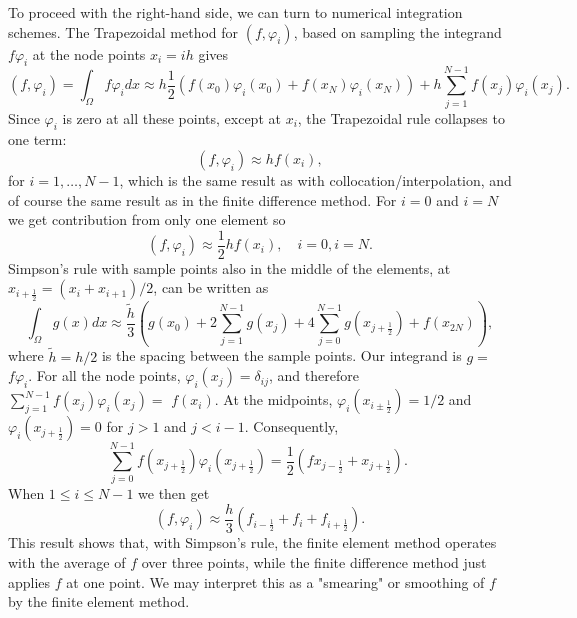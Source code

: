 \documentclass[../main.tex]{subfiles}
\begin{document}
To proceed with the right-hand side, we can turn to numerical integration schemes. The Trapezoidal method for $\left(f, \varphi_{i}\right)$, based on sampling the integrand $f \varphi_{i}$ at the node points $x_{i}=i h$ gives
$$
\left(f, \varphi_{i}\right)=\int_{\Omega} f \varphi_{i} d x \approx h \frac{1}{2}\left(f\left(x_{0}\right) \varphi_{i}\left(x_{0}\right)+f\left(x_{N}\right) \varphi_{i}\left(x_{N}\right)\right)+h \sum_{j=1}^{N-1} f\left(x_{j}\right) \varphi_{i}\left(x_{j}\right) .
$$
Since $\varphi_{i}$ is zero at all these points, except at $x_{i}$, the Trapezoidal rule collapses to one term:
\begin{equation}\label{eqa86}
	\left(f, \varphi_{i}\right) \approx h f\left(x_{i}\right),
\end{equation}
for $i=1, \ldots, N-1$, which is the same result as with collocation/interpolation, and of course the same result as in the finite difference method. For $i=0$ and $i=N$ we get contribution from only one element so
\begin{equation}\label{eqa87}
	\left(f, \varphi_{i}\right) \approx \frac{1}{2} h f\left(x_{i}\right), \quad i=0, i=N .
\end{equation}
Simpson's rule with sample points also in the middle of the elements, at $x_{i+\frac{1}{2}}=\left(x_{i}+x_{i+1}\right) / 2$, can be written as
$$
\int_{\Omega} g(x) d x \approx \frac{\tilde{h}}{3}\left(g\left(x_{0}\right)+2 \sum_{j=1}^{N-1} g\left(x_{j}\right)+4 \sum_{j=0}^{N-1} g\left(x_{j+\frac{1}{2}}\right)+f\left(x_{2 N}\right)\right),
$$
where $\tilde{h}=h / 2$ is the spacing between the sample points. Our integrand is $g=$ $f \varphi_{i}$. For all the node points, $\varphi_{i}\left(x_{j}\right)=\delta_{i j}$, and therefore $\sum_{j=1}^{N-1} f\left(x_{j}\right) \varphi_{i}\left(x_{j}\right)=$ $f\left(x_{i}\right)$. At the midpoints, $\varphi_{i}\left(x_{i \pm \frac{1}{2}}\right)=1 / 2$ and $\varphi_{i}\left(x_{j+\frac{1}{2}}\right)=0$ for $j>1$ and $j<i-1$. Consequently,
$$
\sum_{j=0}^{N-1} f\left(x_{j+\frac{1}{2}}\right) \varphi_{i}\left(x_{j+\frac{1}{2}}\right)=\frac{1}{2}\left(f x_{j-\frac{1}{2}}+x_{j+\frac{1}{2}}\right) \text {. }
$$
When $1 \leq i \leq N-1$ we then get
\begin{equation}\label{eqa88}
	\left(f, \varphi_{i}\right) \approx \frac{h}{3}\left(f_{i-\frac{1}{2}}+f_{i}+f_{i+\frac{1}{2}}\right) .
\end{equation}
This result shows that, with Simpson's rule, the finite element method operates with the average of $f$ over three points, while the finite difference method just applies $f$ at one point. We may interpret this as a "smearing" or smoothing of $f$ by the finite element method.
\end{document}
